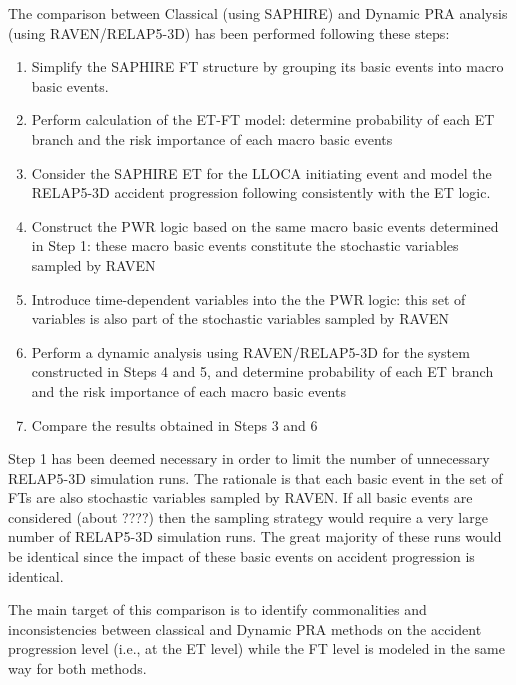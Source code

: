 The comparison between Classical (using SAPHIRE) and Dynamic PRA analysis (using RAVEN/RELAP5-3D)
has been performed following these steps:
\begin{enumerate}
	\item Simplify the SAPHIRE FT structure by grouping its basic events into macro basic events.
	\item Perform calculation of the ET-FT model: determine probability of each ET branch and the 
	      risk importance of each macro basic events
	\item Consider the SAPHIRE ET for the LLOCA initiating event and model the RELAP5-3D accident 
	      progression following consistently with the ET logic. 
	\item Construct the PWR logic based on the same macro basic events determined in Step 1: these
	      macro basic events constitute the stochastic variables sampled by RAVEN 
	\item Introduce time-dependent variables into the the PWR logic: this set of variables is also 
	      part of the stochastic variables sampled by RAVEN 
	\item Perform a dynamic analysis using RAVEN/RELAP5-3D for the system constructed in Steps 4 
	      and 5, and  determine probability of each ET branch and the risk importance of each
	      macro basic events
	\item Compare the results obtained in Steps 3 and 6
\end{enumerate}

Step 1 has been deemed necessary in order to limit the number of unnecessary RELAP5-3D simulation runs.
The rationale is that each basic event in the set of FTs are also stochastic variables sampled by RAVEN.
If all basic events are considered (about ????) then the sampling strategy would require a very large
number of RELAP5-3D simulation runs. The great majority of these runs would be identical since the
impact of these basic events on accident progression is identical.

The main target of this comparison is to identify commonalities and inconsistencies between classical 
and Dynamic PRA methods on the accident progression level (i.e., at the ET level) while the FT level is 
modeled in the same way for both methods.
